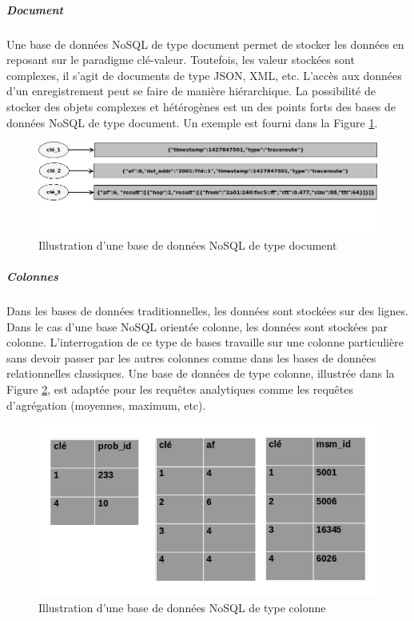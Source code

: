		\subparagraph{Document} Une base de données NoSQL de type document permet de stocker les données en reposant sur le paradigme clé-valeur. Toutefois, les valeur stockées sont complexes, il s'agit de documents de type JSON, XML, etc. L'accès aux données d'un enregistrement peut se faire de manière hiérarchique. La possibilité de stocker des objets complexes et hétérogènes  est un des points forts des bases de données NoSQL de type  document. Un exemple est fourni dans la Figure \ref{fig:document-nosql}.
		
		\begin{figure}[H]
			\centering
			\includegraphics[width=1\linewidth]{illustrations/document-nosql}
			\caption{Illustration d'une base de données NoSQL de type document}
			\label{fig:document-nosql}
		\end{figure}
	

		\subparagraph{Colonnes} Dans les bases de données traditionnelles, les données sont stockées sur des lignes. Dans le cas d'une base NoSQL orientée colonne, les données sont stockées par colonne. L'interrogation de ce type de bases travaille sur une colonne particulière sans devoir passer par les autres colonnes comme dans les bases de données relationnelles classiques. Une base de données de type colonne, illustrée dans la Figure  	\ref{fig:comomn-nosql}, est adaptée pour les requêtes analytiques comme les requêtes d'agrégation (moyennes, maximum, etc).

	
	\begin{figure}[H]
		\centering
		\includegraphics[width=0.7\linewidth]{illustrations/colomn-nosql.png}
		\caption{Illustration d'une base de données NoSQL de type colonne}
		\label{fig:comomn-nosql}
	\end{figure}
	

